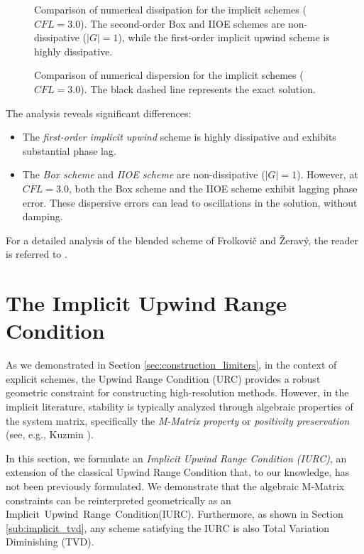 \begin{figure}[htbp]
    \centering
    
    \caption{Comparison of numerical dissipation for the implicit schemes (\(CFL=3.0\)). The second-order Box and IIOE schemes are non-dissipative (\(|G|=1\)), while the first-order implicit upwind scheme is highly dissipative.}
    \label{fig:implicit-ampl-analysis}
\end{figure}

\begin{figure}[htbp]
    \centering
    
    \caption{Comparison of numerical dispersion for the implicit schemes (\(CFL=3.0\)). The black dashed line represents the exact solution.}
    \label{fig:implicit-phase-analysis}
\end{figure}

The analysis reveals significant differences:
\begin{itemize}
    \item The \textit{first-order implicit upwind} scheme is highly dissipative and exhibits substantial phase lag.
    \item The \textit{Box scheme} and \textit{IIOE scheme} are non-dissipative (\(|G|=1\)).
        However, at \(CFL=3.0\), both the Box scheme and the IIOE scheme exhibit lagging phase error.
        These dispersive errors can lead to oscillations in the solution, without damping.
\end{itemize}
For a detailed analysis of the blended scheme of Frolkovi\v{c} and \v{Z}erav\'{y}, the reader is referred to \cite{frolkovic2023high}.

\section{The Implicit Upwind Range Condition}%

As we demonstrated in Section \ref{sec:construction_limiters}, in the context of explicit schemes, the Upwind Range Condition (URC) provides a robust geometric constraint for constructing high-resolution methods.
However, in the implicit literature, stability is typically analyzed through algebraic properties of the system matrix, specifically the \textit{M-Matrix property} or \textit{positivity preservation} (see, e.g., Kuzmin \cite{kuzmin2014hierarchical}).

In this section, we formulate an \textit{Implicit Upwind Range Condition (IURC)}, an extension of the classical Upwind Range Condition that, to our knowledge, has not been previously formulated.
We demonstrate that the algebraic M-Matrix constraints can be reinterpreted geometrically as an Implicit~Upwind~Range~Condition(IURC).
Furthermore, as shown in Section \ref{sub:implicit_tvd}, any scheme satisfying the IURC is also Total Variation Diminishing (TVD).

